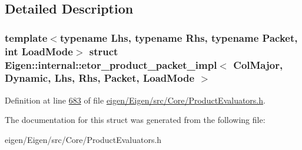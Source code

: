 \subsection{Detailed Description}
\subsubsection*{template$<$typename Lhs, typename Rhs, typename Packet, int Load\+Mode$>$\newline
struct Eigen\+::internal\+::etor\+\_\+product\+\_\+packet\+\_\+impl$<$ Col\+Major, Dynamic, Lhs, Rhs, Packet, Load\+Mode $>$}



Definition at line \hyperlink{eigen_2_eigen_2src_2_core_2_product_evaluators_8h_source_l00683}{683} of file \hyperlink{eigen_2_eigen_2src_2_core_2_product_evaluators_8h_source}{eigen/\+Eigen/src/\+Core/\+Product\+Evaluators.\+h}.



The documentation for this struct was generated from the following file\+:\begin{DoxyCompactItemize}
\item 
eigen/\+Eigen/src/\+Core/\+Product\+Evaluators.\+h\end{DoxyCompactItemize}
